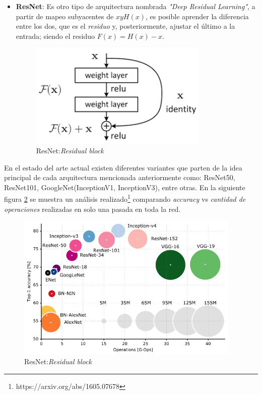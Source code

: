 \begin{itemize}
\item \textbf{ResNet}: Es otro tipo de arquitectura nombrada \textit{"Deep Residual Learning"}, a partir de mapeo subyacentes de $x y H (x)$, es posible aprender la diferencia entre los dos, que es el \textit{residuo} y, posteriormente, ajustar el último a la entrada; siendo el residuo $F(x) = H(x) - x$.

\begin{figure}[H]
 \centering
  \includegraphics[height=5cm,keepaspectratio=true,clip=true]{imagenes/MarcoTeorico/resnet.png}
  \caption{ResNet:\textit{Residual block}}
	\label{Fig:inception}
\end{figure}

\end{itemize}

En el estado del arte actual existen diferentes variantes que parten de la idea principal de cada arquitectura mencionada anteriormente como: ResNet50, ResNet101, GoogleNet(InceptionV1, InceptionV3), entre otras. En la siguiente figura \ref{Fig:cnn-analisis} se muestra un análisis realizado\footnote{https://arxiv.org/abs/1605.07678} comparando \textit{accuracy} vs \textit{cantidad de operaciones} realizadas en solo una pasada en toda la red.

\begin{figure}[H]
 \centering
  \includegraphics[height=7cm,keepaspectratio=true,clip=true]{imagenes/MarcoTeorico/cnn-analisis.png}
  \caption{ResNet:\textit{Residual block}}
	\label{Fig:cnn-analisis}
\end{figure}



